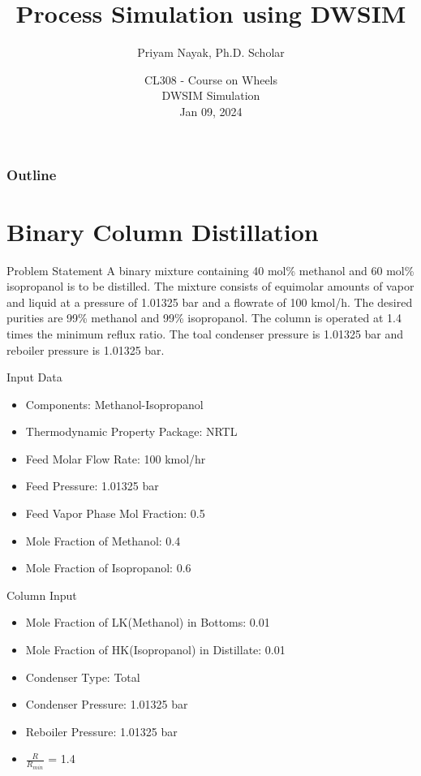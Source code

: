 \documentclass[10pt]{beamer}
\title[CL308]{Process Simulation using DWSIM}%
\author[Priyam Nayak]{Priyam Nayak, Ph.D. Scholar}
\institute[IITB]{Indian Institute of Technology Bombay}
\date[\textcolor{white}{DWSIM Simulation}]
{CL308 - Course on Wheels\\ DWSIM Simulation\\ Jan 09, 2024}
\begin{document}
	
	\frame{\titlepage}
	\begin{frame}
		\frametitle{Outline}
		\tableofcontents
	\end{frame}
	
	
	\AtBeginSection[]
	{
		\begin{frame}
			\frametitle{Table of Contents}
			\tableofcontents[currentsection]
		\end{frame}
	}
	
	\section{Binary Column Distillation}
	\begin{frame}{Problem Statement}
		A binary mixture containing 40 mol\% methanol and 60 mol\% isopropanol is to be distilled. The mixture consists of equimolar amounts of vapor and liquid at a pressure of 1.01325 bar and a flowrate of 100 kmol/h. The desired purities are 99\%  methanol and 99\% isopropanol. The column is operated at 1.4 times the minimum reflux ratio. The toal condenser pressure is 1.01325 bar and reboiler pressure is 1.01325 bar.
	\end{frame}

\begin{frame}{Input Data}
	\begin{itemize}
		\item Components: Methanol-Isopropanol
		\item Thermodynamic Property Package: NRTL
		\item Feed Molar Flow Rate: 100 kmol/hr
		\item Feed Pressure: 1.01325 bar
		\item Feed Vapor Phase Mol Fraction: 0.5
		\item Mole Fraction of Methanol: 0.4
		\item Mole Fraction of Isopropanol: 0.6
	\end{itemize}
\end{frame}

\begin{frame}{Column Input}
	\begin{itemize}
		\item Mole Fraction of LK(Methanol) in Bottoms: 0.01
		\item Mole Fraction of HK(Isopropanol) in Distillate: 0.01
		\item Condenser Type: Total
		\item Condenser Pressure: 1.01325 bar
		\item Reboiler Pressure: 1.01325 bar
		\item $\frac{R}{R_{min}}$ = 1.4
	\end{itemize}
\end{frame}
\end{document}
